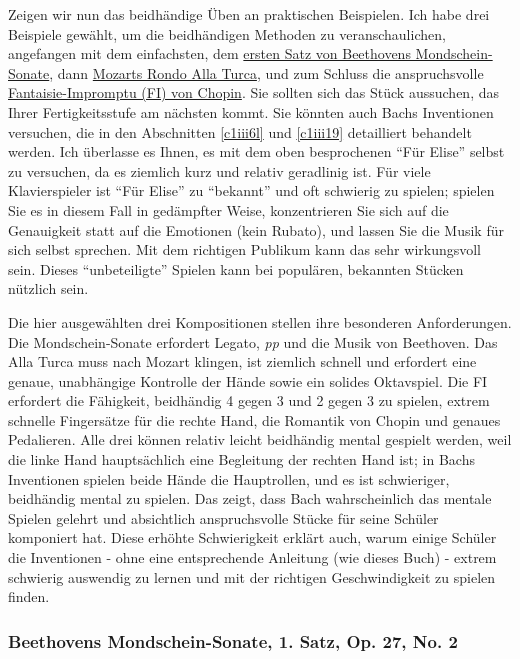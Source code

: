 Zeigen wir nun das beidhändige Üben an praktischen Beispielen.
Ich habe drei Beispiele gewählt, um die beidhändigen Methoden zu veranschaulichen, angefangen mit dem einfachsten, dem \hyperref[c1ii25b]{ersten Satz von Beethovens Mondschein-Sonate}, dann \hyperref[c1ii25c]{Mozarts Rondo Alla Turca}, und zum Schluss die anspruchsvolle \hyperref[c1ii25d]{Fantaisie-Impromptu (FI) von Chopin}.
Sie sollten sich das Stück aussuchen, das Ihrer Fertigkeitsstufe am nächsten kommt.
Sie könnten auch Bachs Inventionen versuchen, die in den Abschnitten \hyperref[c1iii6l]{\autoref{c1iii6l}} und \hyperref[c1iii19]{\autoref{c1iii19}} detailliert behandelt werden.
Ich überlasse es Ihnen, es mit dem oben besprochenen \enquote{Für Elise} selbst zu versuchen, da es ziemlich kurz und relativ geradlinig ist.
Für viele Klavierspieler ist \enquote{Für Elise} zu \enquote{bekannt} und oft schwierig zu spielen; spielen Sie es in diesem Fall in gedämpfter Weise, konzentrieren Sie sich auf die Genauigkeit statt auf die Emotionen (kein Rubato), und lassen Sie die Musik für sich selbst sprechen.
Mit dem richtigen Publikum kann das sehr wirkungsvoll sein.
Dieses \enquote{unbeteiligte} Spielen kann bei populären, bekannten Stücken nützlich sein.

Die hier ausgewählten drei Kompositionen stellen ihre besonderen Anforderungen.
Die Mondschein-Sonate erfordert Legato, \textit{pp} und die Musik von Beethoven.
Das Alla Turca muss nach Mozart klingen, ist ziemlich schnell und erfordert eine genaue, unabhängige Kontrolle der Hände sowie ein solides Oktavspiel.
Die FI erfordert die Fähigkeit, beidhändig 4 gegen 3 und 2 gegen 3 zu spielen, extrem schnelle Fingersätze für die rechte Hand, die Romantik von Chopin und genaues Pedalieren.
Alle drei können relativ leicht beidhändig mental gespielt werden, weil die linke Hand hauptsächlich eine Begleitung der rechten Hand ist; in Bachs Inventionen spielen beide Hände die Hauptrollen, und es ist schwieriger, beidhändig mental zu spielen.
Das zeigt, dass Bach wahrscheinlich das mentale Spielen gelehrt und absichtlich anspruchsvolle Stücke für seine Schüler komponiert hat.
Diese erhöhte Schwierigkeit erklärt auch, warum einige Schüler die Inventionen - ohne eine entsprechende Anleitung (wie dieses Buch) - extrem schwierig auswendig zu lernen und mit der richtigen Geschwindigkeit zu spielen finden.


\subsubsection{Beethovens Mondschein-Sonate, 1. Satz, Op. 27, No. 2}
\label{c1ii25b}

